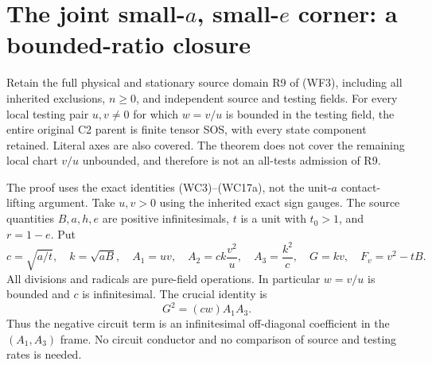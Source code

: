 \section{The joint small-$a$, small-$e$ corner: a bounded-ratio closure}
\label{sec:r14-r9-bounded-ratio}

\begin{theorem}
Retain the full physical and stationary source domain R9 of (WF3),
including all inherited exclusions, $n\ge0$, and independent source
and testing fields. For every local testing pair $u,v\ne0$ for which
$w=v/u$ is bounded in the testing field, the entire original C2 parent
is finite tensor SOS, with every state component retained. Literal
axes are also covered. The theorem does not cover the remaining
local chart $v/u$ unbounded, and therefore is not an all-tests
admission of R9.
\end{theorem}

The proof uses the exact identities (WC3)--(WC17a), not the unit-$a$
contact-lifting argument. Take $u,v>0$ using the inherited exact sign
gauges. The source quantities $B,a,h,e$ are positive infinitesimals,
$t$ is a unit with $t_0>1$, and $r=1-e$. Put
\[
 c=\sqrt{a/t},\quad k=\sqrt{aB},\quad
 A_1=uv,
 \quad A_2=ck\frac{v^2}{u},\quad A_3=\frac{k^2}{c},
 \quad G=kv,\quad F_v=v^2-tB.
\]
All divisions and radicals are pure-field operations. In particular
$w=v/u$ is bounded and $c$ is infinitesimal. The crucial identity is
\[
 \boxed{G^2=(cw)A_1A_3.}                              \tag{R9B1}
\]
Thus the negative circuit term is an infinitesimal off-diagonal
coefficient in the $(A_1,A_3)$ frame. No circuit conductor and no
comparison of source and testing rates is needed.

